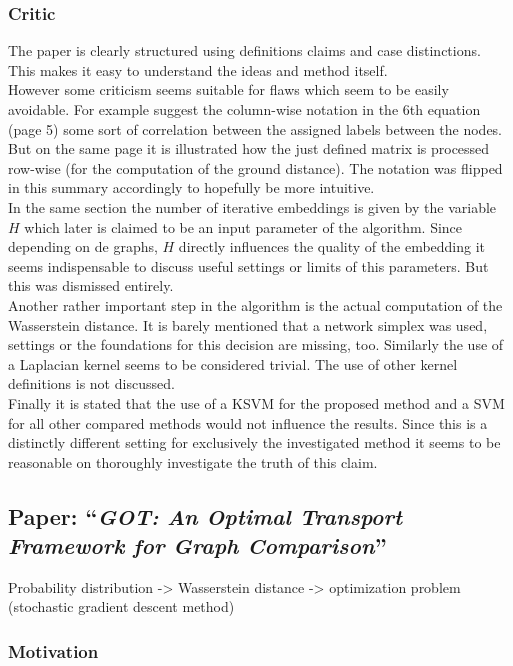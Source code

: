\documentclass[twoside]{scrartcl}
\begin{document}
\subsubsection{Critic}
The paper is clearly structured using definitions claims and case distinctions. This makes it easy to understand the ideas and method itself.\\
However some criticism seems suitable for flaws which seem to be easily avoidable. For example suggest the column-wise notation in the 6th equation (page 5) some sort of correlation between the assigned labels between the nodes. But on the same page it is illustrated how the just defined matrix is processed row-wise (for the computation of the ground distance). The notation was flipped in this summary accordingly to hopefully be more intuitive.\\
In the same section the number of iterative embeddings is given by the variable $H$ which later is claimed to be an input parameter of the algorithm. Since depending on de graphs, $H$ directly influences the quality of the embedding it seems indispensable to discuss useful settings or limits of this parameters. But this was dismissed entirely.\\

Another rather important step in the algorithm is the actual computation of the Wasserstein distance. It is barely mentioned that a network simplex was used, settings or the foundations for this decision are missing, too. Similarly the use of a Laplacian kernel seems to be considered trivial. The use of other kernel definitions is not discussed.\\

Finally it is stated that the use of a KSVM for the proposed method and a SVM for all other compared methods would not influence the results. Since this is a distinctly different setting for exclusively the investigated method it seems to be reasonable on thoroughly investigate the truth of this claim.

\subsection{Paper: \enquote{\textit{GOT: An Optimal Transport Framework for Graph Comparison}}}
Probability distribution -> Wasserstein distance -> optimization problem (stochastic gradient descent method)

\subsubsection{Motivation}
\end{document}
